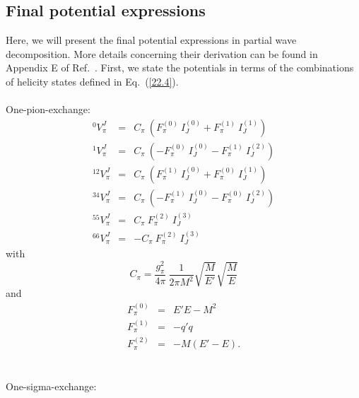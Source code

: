 \subsection{Final potential expressions}
Here, we will present the final potential expressions in partial wave
decomposition.  More details concerning 
their derivation can be found in Appendix E of Ref.~\cite{MHE87}.
First, we state the potentials in terms of the combinations of helicity
states defined in Eq.~(\ref{22.4}).
\\ \\
One-pion-exchange:
\begin{eqnarray}
^0V^J_{\pi} & = &
C_{\pi}\: ( F^{(0)}_{\pi}\: I^{(0)}_J + F^{(1)}_{\pi}\: I^{(1)}_J )
\nonumber \\
^1V^J_{\pi} & = &
C_{\pi}\: ( -F^{(0)}_{\pi}\: I^{(0)}_J - F^{(1)}_{\pi}\: I^{(2)}_J )
\nonumber \\
^{12}V^J_{\pi} & = &
C_{\pi}\: ( F^{(1)}_{\pi}\: I^{(0)}_J + F^{(0)}_{\pi}\: I^{(1)}_J )
\label{32.3} \\
^{34}V^J_{\pi} & = &
C_{\pi}\: ( -F^{(1)}_{\pi}\: I^{(0)}_J - F^{(0)}_{\pi}\: I^{(2)}_J )
\nonumber \\
^{55}V^J_{\pi} & = &
C_{\pi}\:  F^{(2)}_{\pi}\: I^{(3)}_J
\nonumber \\
^{66}V^J_{\pi} & = &
-C_{\pi}\:  F^{(2)}_{\pi}\: I^{(3)}_J
\nonumber
\end{eqnarray}
with
\begin{equation}
C_{\pi}= \frac{g^2_{\pi}}{4\pi}\: \frac{
1
}{2\pi M^2}
\sqrt{\frac{M}{E'}}
\sqrt{\frac{M}{E}}
\label{32.4}
\end{equation}
and
\begin{eqnarray}
F^{(0)}_{\pi} & = & E'E-M^2 \nonumber \\
F^{(1)}_{\pi} & = & -q'q \label{32.5} \\
F^{(2)}_{\pi} & = & -M(E'-E) . \nonumber
\end{eqnarray}
\\ \\
One-sigma-exchange:
